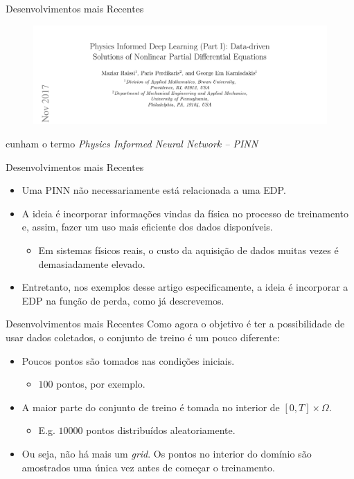 \documentclass[13pt]{beamer}
\begin{document}
\begin{frame}{Desenvolvimentos mais Recentes}
    \begin{figure}[htb]
        \includegraphics[width=\textwidth]{../figuras/pinn.png}
    \end{figure}
    \cite{raissi17} cunham o termo \emph{Physics Informed Neural Network -- PINN}
\end{frame}

\begin{frame}{Desenvolvimentos mais Recentes}
    \begin{itemize}
        \item<1-> Uma PINN não necessariamente está relacionada a uma EDP.
        \item<2-> A ideia é incorporar informações vindas da física no processo de treinamento e, assim, fazer um uso mais eficiente dos dados disponíveis.
            \begin{itemize}
                \item Em sistemas físicos reais, o custo da aquisição de dados muitas vezes é demasiadamente elevado.
            \end{itemize}
        \item<3-> Entretanto, nos exemplos desse artigo especificamente, a ideia é incorporar a EDP na função de perda, como já descrevemos.
    \end{itemize}
\end{frame}

\begin{frame}{Desenvolvimentos mais Recentes}
    Como agora o objetivo é ter a possibilidade de usar dados coletados, o conjunto de treino é um pouco diferente:
    \begin{itemize}
        \item<2-> Poucos pontos são tomados nas condições iniciais.
            \begin{itemize}
                \item \( 100 \) pontos, por exemplo.
            \end{itemize}
        \item<3-> A maior parte do conjunto de treino é tomada no interior de \( [0, T] \times \Omega \).
            \begin{itemize}
                \item E.g. \( 10 000 \) pontos distribuídos aleatoriamente.
            \end{itemize}
        \item<4-> Ou seja, não há mais um \emph{grid}.
            Os pontos no interior do domínio são amostrados uma única vez antes de começar o treinamento.
    \end{itemize}
\end{frame}
\end{document}
